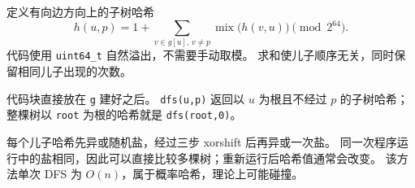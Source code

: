 定义有向边方向上的子树哈希
\[
  h(u,p)=1+\sum_{v\in g[u],\,v\ne p}
  \operatorname{mix}\bigl(h(v,u)\bigr)
  \pmod{2^{64}}.
\]
代码使用 \texttt{uint64\_t} 自然溢出，不需要手动取模。
求和使儿子顺序无关，同时保留相同儿子出现的次数。

代码块直接放在 \texttt{g} 建好之后。
\texttt{dfs(u,p)} 返回以 $u$ 为根且不经过 $p$ 的子树哈希；整棵树以
\texttt{root} 为根的哈希就是 \texttt{dfs(root,0)}。

每个儿子哈希先异或随机盐，经过三步 xorshift 后再异或一次盐。
同一次程序运行中的盐相同，因此可以直接比较多棵树；重新运行后哈希值通常会改变。
该方法单次 DFS 为 $O(n)$，属于概率哈希，理论上可能碰撞。
